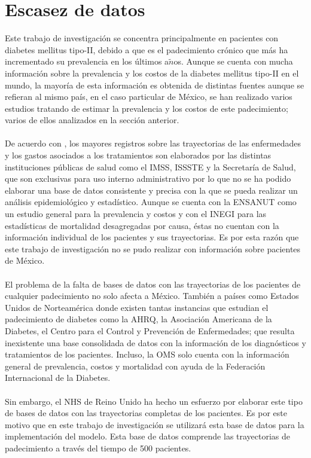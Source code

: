 \section{Escasez de datos}
Este trabajo de investigaci\'on se concentra principalmente en pacientes con diabetes mellitus tipo-II, debido a que es el padecimiento cr\'onico que m\'as ha incrementado su prevalencia en los \'ultimos a$\tilde{n}$os. Aunque se cuenta con mucha informaci\'on sobre la prevalencia y los costos de la diabetes mellitus tipo-II en el mundo, la mayor\'ia de esta informaci\'on es obtenida de distintas fuentes aunque se refieran al mismo pa\'is, en el caso particular de M\'exico, se han realizado varios estudios tratando de estimar la prevalencia y los costos de este padecimiento; varios de ellos analizados en la secci\'on anterior.\\
\\
De acuerdo con \cite{barquera2013diabetes}, los mayores registros sobre las trayectorias de las enfermedades y los gastos asociados a los tratamientos son elaborados por las distintas instituciones p\'ublicas de salud como el IMSS, ISSSTE y la Secretar\'ia de Salud, que son exclusivas para uso interno administrativo por lo que no se ha podido elaborar una base de datos consistente y precisa con la que se pueda realizar un an\'alisis epidemiol\'ogico y estad\'istico. Aunque se cuenta con la ENSANUT como un estudio general para la prevalencia y costos y con el INEGI para las estad\'isticas de mortalidad desagregadas por causa, \'estas no cuentan con la informaci\'on individual de los pacientes y sus trayectorias. Es por esta raz\'on que este trabajo de investigaci\'on no se pudo realizar con informaci\'on sobre pacientes de M\'exico.\\
\\
El problema de la falta de bases de datos con las trayectorias de los pacientes de cualquier padecimiento no solo afecta a M\'exico. Tambi\'en a pa\'ises como Estados Unidos de Norteam\'erica donde existen tantas instancias que estudian el padecimiento de diabetes como la AHRQ, la Asociaci\'on Americana de la Diabetes, el Centro para el Control y Prevenci\'on de Enfermedades; que resulta inexistente una base consolidada de datos con la informaci\'on de los diagn\'osticos y tratamientos de los pacientes. Incluso, la OMS solo cuenta con la informaci\'on general de prevalencia, costos y mortalidad con ayuda de la Federaci\'on Internacional de la Diabetes.\\
\\
Sin embargo, el NHS de Reino Unido ha hecho un esfuerzo por elaborar este tipo de bases de datos con las trayectorias completas de los pacientes. Es por este motivo que en este trabajo de investigaci\'on se utilizar\'a esta base de datos para la implementaci\'on del modelo. Esta base de datos comprende las trayectorias de padecimiento a trav\'es del tiempo de 500 pacientes.\\
